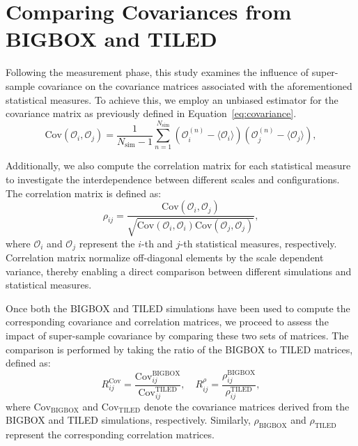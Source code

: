 \section{Comparing Covariances from BIGBOX and TILED}
Following the measurement phase, this study examines the influence of super-sample covariance on the covariance matrices associated with the aforementioned statistical measures. To achieve this, we employ an unbiased estimator for the covariance matrix as previously defined in Equation~\ref{eq:covariance}. 
\begin{equation}
    \label{eq:covariance}
    \mathrm{Cov}(\mathcal{O}_i, \mathcal{O}_j) = \frac{1}{N_{\mathrm{sim}} - 1} \sum_{n=1}^{N_{\mathrm{sim}}} (\mathcal{O}_i^{(n)} - \langle \mathcal{O}_i \rangle) (\mathcal{O}_j^{(n)} - \langle \mathcal{O}_j \rangle),
\end{equation}

Additionally, we also compute the correlation matrix for each statistical measure to investigate the interdependence between different scales and configurations. The correlation matrix is defined as:
\begin{equation}
    \rho_{ij} = \frac{\text{Cov}(\mathcal{O}_i, \mathcal{O}_j)}{\sqrt{\text{Cov}(\mathcal{O}_i, \mathcal{O}_i)\text{Cov}(\mathcal{O}_j, \mathcal{O}_j)}},
\end{equation}
where $\mathcal{O}_i$ and $\mathcal{O}_j$ represent the $i$-th and $j$-th statistical measures, respectively. Correlation matrix normalize off-diagonal elements by the scale dependent variance, thereby enabling a direct comparison between different simulations and statistical measures.

Once both the BIGBOX and TILED simulations have been used to compute the corresponding covariance and correlation matrices, we proceed to assess the impact of super-sample covariance by comparing these two sets of matrices. The comparison is performed by taking the ratio of the BIGBOX to TILED matrices, defined as:
\begin{equation}
    R^{\mathrm{Cov}}_{ij} = \frac{\mathrm{Cov}^{\mathrm{BIGBOX}}_{ij}}{\mathrm{Cov}^{\mathrm{TILED}}_{ij}}, \quad R^{\rho}_{ij} = \frac{\rho^{\mathrm{BIGBOX}}_{ij}}{\rho^{\mathrm{TILED}}_{ij}},
\end{equation}
where $\mathrm{Cov}_{\mathrm{BIGBOX}}$ and $\mathrm{Cov}_{\mathrm{TILED}}$ denote the covariance matrices derived from the BIGBOX and TILED simulations, respectively. Similarly, $\rho_{\mathrm{BIGBOX}}$ and $\rho_{\mathrm{TILED}}$ represent the corresponding correlation matrices.

